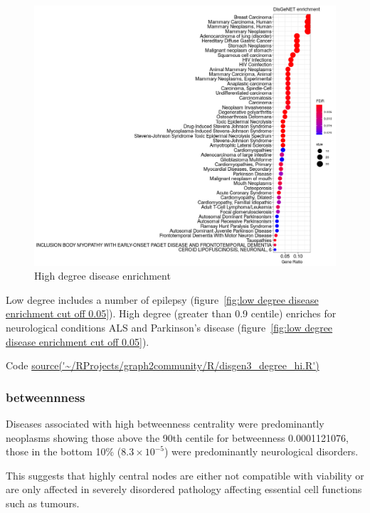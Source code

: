 \begin{figure}
    \centering
    \includegraphics[width=\textwidth]{images/Rplot_high_deg_0.9_0.05cutoff_disgen.png}
    \caption{High degree disease enrichment}
    \label{fig:High degree disease enrichment cut off 0.05}
\end{figure}
Low degree includes a number of epilepsy (figure~\ref{fig:low degree disease enrichment cut off 0.05}). High degree (greater than 0.9 centile) enriches for neurological conditions ALS and Parkinson's disease (figure~\ref{fig:low degree disease enrichment cut off 0.05}).


Code \url{source('~/RProjects/graph2community/R/disgen3_degree_hi.R')}
\subsubsection{betweennness}

Diseases associated with high betweenness centrality were predominantly neoplasms showing those above the 90th centile for betweenness 0.0001121076, those in the bottom 10\% ($8.3 \times 10^{-5}$) were predominantly neurological disorders.

This suggests that highly central nodes are either not compatible with viability or are only affected in severely disordered pathology affecting essential cell functions such as tumours. 




